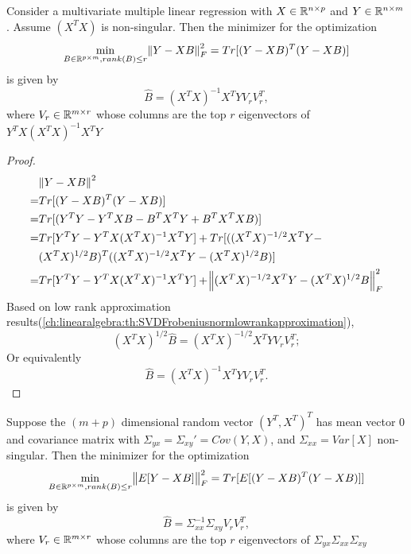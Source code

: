 \begin{refsection}
\begin{theorem}
Consider a multivariate multiple linear regression with $X\in \mathbb{R}^{n\times p}$ and $Y\in \mathbb{R}^{n\times m}$. Assume $(X^TX)$ is non-singular. 	
	Then the minimizer for the optimization
	$$\min_{B\in \mathbb{R}^{p\times m}, rank(B)\leq r} \norm{Y - XB}_F^2 = Tr[(Y - XB)^T(Y-XB)]$$
	is given by
	$$\hat{B} = (X^TX)^{-1}X^TYV_rV_r^T,$$
	where $V_r \in \mathbb{R}^{m\times r}$ whose columns are the top $r$ eigenvectors of $Y^TX(X^TX)^{-1}X^TY$
\end{theorem}
\begin{proof}
\begin{align*}
 &\norm{Y - XB}^2 \\
=& Tr[(Y  -XB)^T(Y - XB)] \\
=& Tr[(Y^TY - Y^TXB - B^TX^TY + B^TX^TXB)] \\
=& Tr[Y^TY - Y^TX(X^TX)^{-1}X^TY] + Tr[((X^TX)^{-1/2}X^TY - \\ &(X^TX)^{1/2}B)^T((X^TX)^{-1/2}X^TY - (X^TX)^{1/2}B)] \\
=& Tr[Y^TY - Y^TX(X^TX)^{-1}X^TY] + \norm{(X^TX)^{-1/2}X^TY - (X^TX)^{1/2}B}_F^2 
\end{align*}
Based on low rank approximation results(\autoref{ch:linearalgebra:th:SVDFrobeniusnormlowrankapproximation}), 
$$(X^TX)^{1/2}\hat{B} = (X^TX)^{-1/2}X^TYV_rV_r^T;$$ Or equivalently
$$\hat{B} = (X^TX)^{-1}X^TYV_rV_r^T.$$ 
\end{proof}







\begin{corollary}
Suppose the $(m+p)$ dimensional random vector $(Y^T, X^T)^T$ has mean vector 0 and covariance matrix with $\Sigma_{yx} = \Sigma_{xy}' = Cov(Y, X)$, and $\Sigma_{xx} = Var[X]$ non-singular. Then the minimizer for the optimization
$$\min_{B\in \mathbb{R}^{p\times m}, rank(B)\leq r} \norm{E[Y - XB]}_F^2 = Tr[E[(Y - XB)^T(Y-XB)]]$$
is given by
$$\hat{B} = \Sigma_{xx}^{-1}\Sigma_{xy}V_rV_r^T,$$
where $V_r \in \mathbb{R}^{m\times r}$ whose columns are the top $r$ eigenvectors of $\Sigma_{yx}\Sigma_{xx}\Sigma_{xy}$
\end{corollary}



\end{refsection}
